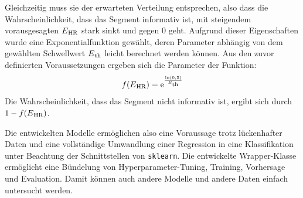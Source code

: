 Gleichzeitig muss sie der erwarteten Verteilung entsprechen, also dass die Wahrscheinlichkeit, dass das Segment informativ ist, mit steigendem vorausgesagten $E\textsubscript{HR}$ stark sinkt und gegen 0 geht. Aufgrund dieser Eigenschaften wurde eine Exponentialfunktion gewählt, deren Parameter abhängig von dem gewählten Schwellwert $E\textsubscript{th}$ leicht berechnet werden können. Aus den zuvor definierten Voraussetzungen ergeben sich die Parameter der Funktion:
\[
	f(E\textsubscript{HR}) = \text{e}^{\frac{\text{ln}(0,5)}{E\textsubscript{th}}}
\]
Die Wahrscheinlichkeit, dass das Segment nicht informativ ist, ergibt sich durch $1-f(E\textsubscript{HR})$.

Die entwickelten Modelle ermöglichen also eine Voraussage trotz lückenhafter Daten und eine vollständige Umwandlung einer Regression in eine Klassifikation unter Beachtung der Schnittstellen von \texttt{sklearn}. Die entwickelte Wrapper-Klasse ermöglicht eine Bündelung von Hyperparameter-Tuning, Training, Vorhersage und Evaluation. Damit können auch andere Modelle und andere Daten einfach untersucht werden.





